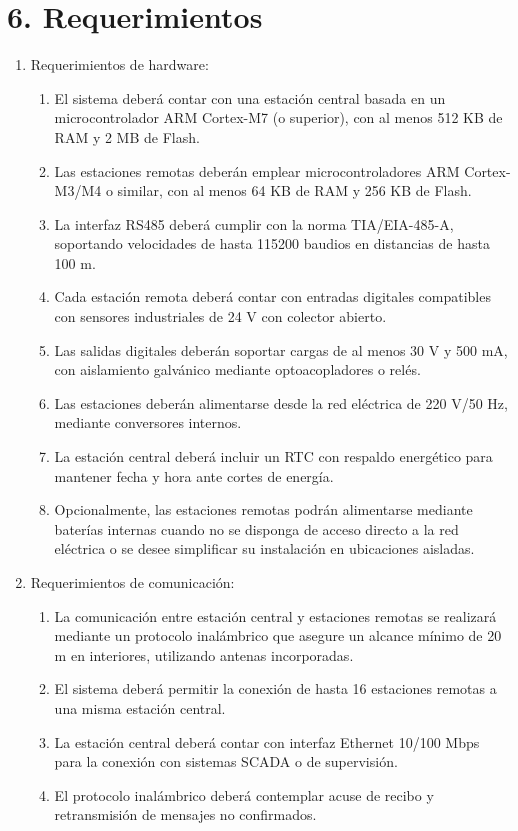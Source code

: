 \documentclass[
11pt, %
]{charter}
\begin{document}
\section{6. Requerimientos}
\label{sec:requerimientos}

\begin{enumerate}
	\item Requerimientos de hardware:
		\begin{enumerate}
			\item El sistema deberá contar con una estación central basada en un microcontrolador ARM Cortex-M7 (o superior), con al menos 512 KB de RAM y 2 MB de Flash.
			\item Las estaciones remotas deberán emplear microcontroladores ARM Cortex-M3/M4 o similar, con al menos 64 KB de RAM y 256 KB de Flash.
			\item La interfaz RS485 deberá cumplir con la norma TIA/EIA-485-A, soportando velocidades de hasta 115200 baudios en distancias de hasta 100 m.
			\item Cada estación remota deberá contar con entradas digitales compatibles con sensores industriales de 24 V con colector abierto.
			\item Las salidas digitales deberán soportar cargas de al menos 30 V y 500 mA, con aislamiento galvánico mediante optoacopladores o relés.
			\item Las estaciones deberán alimentarse desde la red eléctrica de 220 V/50 Hz, mediante conversores internos.
			\item La estación central deberá incluir un RTC con respaldo energético para mantener fecha y hora ante cortes de energía.
			\item Opcionalmente, las estaciones remotas podrán alimentarse mediante baterías internas cuando no se disponga de acceso directo a la red eléctrica o se desee simplificar su instalación en ubicaciones aisladas.
		\end{enumerate}
		
	\item Requerimientos de comunicación:
		\begin{enumerate}
			\item La comunicación entre estación central y estaciones remotas se realizará mediante un protocolo inalámbrico que asegure un alcance mínimo de 20 m en interiores, utilizando antenas incorporadas.
			\item El sistema deberá permitir la conexión de hasta 16 estaciones remotas a una misma estación central.
			\item La estación central deberá contar con interfaz Ethernet 10/100 Mbps para la conexión con sistemas SCADA o de supervisión.
			\item El protocolo inalámbrico deberá contemplar acuse de recibo y retransmisión de mensajes no confirmados.
		\end{enumerate}
		

\end{enumerate}
\end{document}
